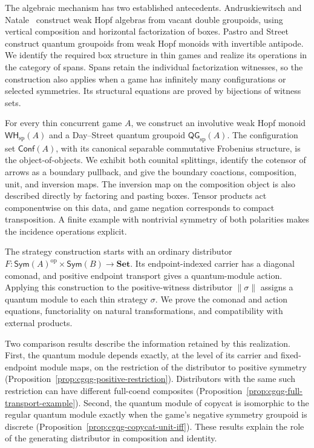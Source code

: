 \documentclass[oneside]{article}
\newcommand{\Conf}{\mathsf{Conf}}
\newcommand{\Sym}{\mathsf{Sym}}
\newcommand{\WH}{\mathsf{WH}}
\newcommand{\QG}{\mathsf{QG}}
\newcommand{\op}{\mathrm{op}}
\theoremstyle{plain}
\theoremstyle{definition}
\theoremstyle{remark}
\begin{document}
The algebraic mechanism has two established antecedents.
Andruskiewitsch and Natale~\cite{AndruskiewitschNatale2005} construct weak
Hopf algebras from vacant double groupoids, using vertical composition
and horizontal factorization of boxes. Pastro and Street
\cite{PastroStreet2009} construct quantum groupoids from weak Hopf
monoids with invertible antipode. We identify the required box structure
in thin games and realize its operations in the category of spans.
Spans retain the individual factorization witnesses, so the construction
also applies when a game has infinitely many configurations or selected
symmetries. Its structural equations are proved by bijections of witness
sets.

For every thin concurrent game \(A\), we construct an involutive weak
Hopf monoid \(\WH_{\mathrm{sp}}(A)\) and a Day--Street quantum groupoid
\(\QG_{\mathrm{sp}}(A)\). The configuration set \(\Conf(A)\), with
its canonical separable commutative Frobenius structure, is the
object-of-objects. We exhibit both counital splittings, identify the
cotensor of arrows as a boundary pullback, and give the boundary
coactions, composition, unit, and inversion maps. The inversion map on
the composition object is also described directly by factoring and
pasting boxes. Tensor products act componentwise on this data, and game
negation corresponds to compact transposition. A finite example with
nontrivial symmetry of both polarities makes the incidence operations
explicit.

The strategy construction starts with an ordinary distributor
\(F:\Sym(A)^{\op}\times\Sym(B)\to\mathbf{Set}\). Its endpoint-indexed
carrier has a diagonal comonad, and positive endpoint transport gives a
quantum-module action. Applying this construction to the positive-witness
distributor \(\lVert\sigma\rVert\) assigns a quantum module to each
thin strategy \(\sigma\). We prove the comonad and action equations,
functoriality on natural transformations, and compatibility with external
products.

Two comparison results describe the information retained by this
realization. First, the quantum module depends exactly, at the level of
its carrier and fixed-endpoint module maps, on the restriction of the
distributor to positive symmetry
(Proposition~\ref{prop:cgqg-positive-restriction}). Distributors with the
same such restriction can have different full-coend composites
(Proposition~\ref{prop:cgqg-full-transport-example}). Second, the quantum
module of copycat is isomorphic to the regular quantum module exactly
when the game's negative symmetry groupoid is discrete
(Proposition~\ref{prop:cgqg-copycat-unit-iff}). These results explain the
role of the generating distributor in composition and identity.
\end{document}
